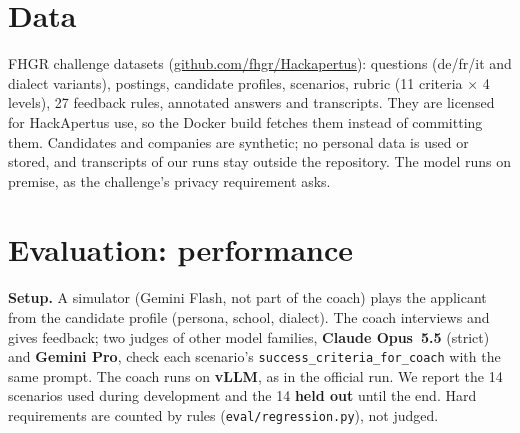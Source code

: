 \documentclass[10pt,a4paper]{article}
\newcommand{\crit}[2]{\tcbox[on line,colback=#1,colframe=#1,coltext=white,boxsep=0pt,left=3pt,right=3pt,top=1.5pt,bottom=1.5pt,arc=2pt,fontupper=\sffamily\bfseries\scriptsize]{#2}}
\newcommand{\perf}{\crit{steel}{Performance 50\,\%}}
\begin{document}
\section{Data}
FHGR challenge datasets (\href{https://github.com/fhgr/Hackapertus}{github.com/fhgr/Hackapertus}): questions (de/fr/it and
dialect variants), postings, candidate profiles, scenarios, rubric (11 criteria $\times$ 4 levels), 27 feedback rules,
annotated answers and transcripts. They are licensed for HackApertus use, so the Docker build fetches them instead of
committing them. Candidates and companies are synthetic; no personal data is used or stored, and transcripts of our
runs stay outside the repository. The model runs on premise, as the challenge's privacy requirement asks.

\section{Evaluation: performance}\label{sec:perf}
\perf{}\quad
\textbf{Setup.} A simulator (Gemini Flash, not part of the coach) plays the applicant from the candidate profile (persona,
school, dialect). The coach interviews and gives feedback; two judges of other model families, \textbf{Claude Opus~5.5} (strict) and \textbf{Gemini Pro},
check each scenario's \texttt{success\_criteria\_for\_coach} with the same prompt. The coach runs on \textbf{vLLM}, as in the
official run. We report the 14 scenarios used during development and the 14 \textbf{held out} until the end. Hard requirements are counted
by rules (\texttt{eval/regression.py}), not judged.
\end{document}
